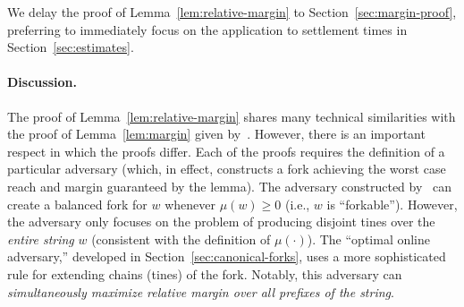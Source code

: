We delay the proof of Lemma~\ref{lem:relative-margin} to
Section~\ref{sec:margin-proof}, preferring to immediately focus on the
application to settlement times in Section~\ref{sec:estimates}.

\paragraph{Discussion.} The proof of Lemma~\ref{lem:relative-margin}
shares many technical similarities with the proof of
Lemma~\ref{lem:margin} given by~\citet{KRDO17}. However, there is an
important respect in which the proofs differ. Each of the proofs
requires the definition of a particular adversary (which, in effect,
constructs a fork achieving the worst case reach and margin guaranteed
by the lemma). The adversary constructed by~\cite{KRDO17} can create a
balanced fork for $w$ whenever $\mu(w) \geq 0$ (i.e., $w$ is
``forkable''). However, the adversary only focuses on the problem of
producing disjoint tines over the \emph{entire string} $w$ (consistent
with the definition of $\mu(\cdot)$). The ``optimal online adversary,''
developed in Section~\ref{sec:canonical-forks},
uses a more sophisticated rule for extending chains (tines) of the
fork. 
Notably, this adversary can \emph{simultaneously maximize relative margin
  over all prefixes of the string}. 

%


